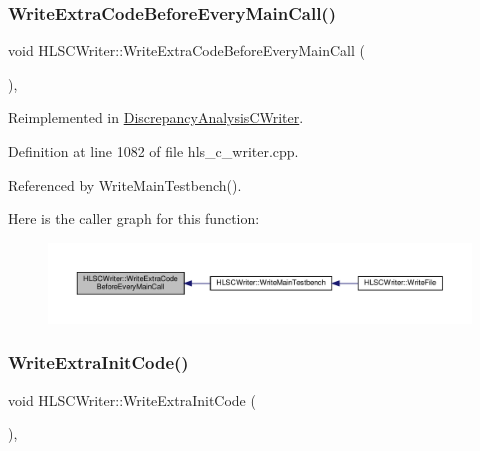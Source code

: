 \subsubsection{\texorpdfstring{Write\+Extra\+Code\+Before\+Every\+Main\+Call()}{WriteExtraCodeBeforeEveryMainCall()}}
{\footnotesize\ttfamily void H\+L\+S\+C\+Writer\+::\+Write\+Extra\+Code\+Before\+Every\+Main\+Call (\begin{DoxyParamCaption}{ }\end{DoxyParamCaption})\hspace{0.3cm}{\ttfamily [protected]}, {\ttfamily [virtual]}}



Reimplemented in \hyperlink{classDiscrepancyAnalysisCWriter_a174c35dd3c04952215d5a5f9aa0df0c9}{Discrepancy\+Analysis\+C\+Writer}.



Definition at line 1082 of file hls\+\_\+c\+\_\+writer.\+cpp.



Referenced by Write\+Main\+Testbench().

Here is the caller graph for this function\+:
\nopagebreak
\begin{figure}[H]
\begin{center}
\leavevmode
\includegraphics[width=350pt]{d4/db1/classHLSCWriter_a3b1718b9bd4cf44bf5c9e73af2b25986_icgraph}
\end{center}
\end{figure}
\mbox{\label{classHLSCWriter_a05886037980c7ec5aa2df5880081682c}} 
\subsubsection{\texorpdfstring{Write\+Extra\+Init\+Code()}{WriteExtraInitCode()}}
{\footnotesize\ttfamily void H\+L\+S\+C\+Writer\+::\+Write\+Extra\+Init\+Code (\begin{DoxyParamCaption}{ }\end{DoxyParamCaption})\hspace{0.3cm}{\ttfamily [protected]}, {\ttfamily [virtual]}}



